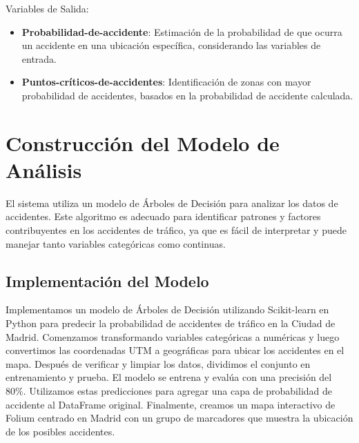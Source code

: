 Variables de Salida:

\begin{itemize}
\item \textbf{Probabilidad-de-accidente}: Estimación de la probabilidad de que ocurra un accidente en una ubicación específica, considerando las variables de entrada.
\item \textbf{Puntos-críticos-de-accidentes}: Identificación de zonas con mayor probabilidad de accidentes, basados en la probabilidad de accidente calculada.
\end{itemize}

\section{Construcción del Modelo de Análisis}
El sistema utiliza un modelo de Árboles de Decisión para analizar los datos de accidentes. Este algoritmo es adecuado para identificar patrones y factores contribuyentes en los accidentes de tráfico, ya que es fácil de interpretar y puede manejar tanto variables categóricas como continuas.

\subsection{Implementación del Modelo}
Implementamos un modelo de Árboles de Decisión utilizando Scikit-learn en Python para predecir la probabilidad de accidentes de tráfico en la Ciudad de Madrid. Comenzamos transformando variables categóricas a numéricas y luego convertimos las coordenadas UTM a geográficas para ubicar los accidentes en el mapa. Después de verificar y limpiar los datos, dividimos el conjunto en entrenamiento y prueba. El modelo se entrena y evalúa con una precisión del 80\%. Utilizamos estas predicciones para agregar una capa de probabilidad de accidente al DataFrame original. Finalmente, creamos un mapa interactivo de Folium centrado en Madrid con un grupo de marcadores que muestra la ubicación de los posibles accidentes.

